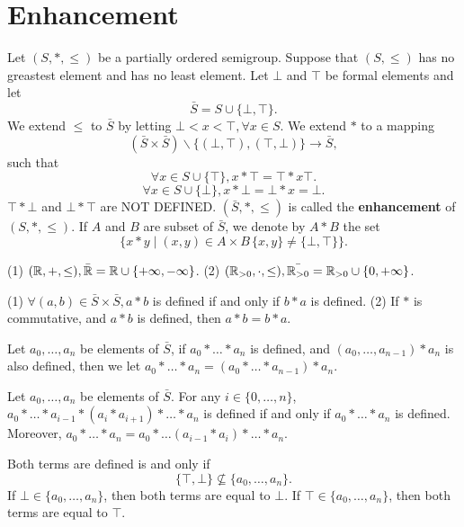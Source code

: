 \section{Enhancement}
\begin{definitionenv}
    Let $(S,*,\le)$ be a partially ordered semigroup. Suppose that $(S,\le )$ has no greastest element and has no least element. Let $\bot$ and $\top$ be formal elements and let 
    $$\bar{S}=S\cup\{\bot,\top\}.$$
    We extend $\le $ to $\bar{S}$ by letting $\bot<x<\top,\forall x\in S$. We extend $*$ to a mapping
    $$\left(\bar{S}\times\bar{S}\right)\backslash \{(\bot,\top),(\top,\bot)\}\longrightarrow \bar{S},$$
    such that 
    $$\forall x\in S\cup\{\top\},x*\top=\top*x\top.$$
    $$\forall x\in S\cup\{\bot\},x*\bot=\bot*x=\bot.$$
    $\top*\bot$ and $\bot*\top$ are NOT DEFINED. $(\bar{S},*,\le)$ is called the \textbf{enhancement} of $(S,*,\le)$. If $A$ and $B$ are subset of $\bar{S}$, we denote by $A*B$ the set 
    $$\{x*y\mid (x,y)\in A\times B\,\{x,y\}\not=\{\bot,\top\}\}.$$
\end{definitionenv}
\begin{exampleenv}
    \quad 
    \newline
    (1) $(\mathbb{R},+,\le ), \bar{\mathbb{R}}=\mathbb{R}\cup\{+\infty,-\infty\}$.
    \newline
    (2) $(\mathbb{R}_{>0},\cdot,\le),\bar{\mathbb{R}_{>0}}=\mathbb{R}_{>0}\cup\{0,+\infty\}$.
\end{exampleenv}
\begin{remark}
    \quad 
    \newline
    (1) $\forall (a,b)\in \bar{S}\times \bar{S}, a*b$ is defined if and only if $b*a$ is defined. 
    \newline
    (2) If $*$ is commutative, and $a*b$ is defined, then $a*b=b*a$.
\end{remark}
\begin{definitionenv}
    Let $a_0,\dots,a_n$ be elements of $\bar{S}$, if $a_0*\dots*a_n$ is defined, and $(a_0,\dots,a_{n-1})*a_n$ is also defined, then we let $a_0*\dots*a_n=\left(a_0*\dots*a_{n-1}\right)*a_n$.
\end{definitionenv}
\begin{propositionenv}
    Let $a_0,\dots,a_n$ be elements of $\bar{S}$. For any $i\in \{0,\dots,n\}$, $a_0*\dots*a_{i-1}*(a_i*a_{i+1})*\dots*a_n$ is defined if and only if $a_0*\dots*a_n$ is defined. Moreover, $a_0*\dots*a_n=a_0*\dots (a_{i-1}*a_i)*\dots*a_n $.
\end{propositionenv}
\begin{proofenv}
    Both terms are defined is and only if 
    $$\{\top,\bot\}\nsubseteq\{a_0,\dots,a_n\}.$$
    If $\bot\in\{a_0,\dots,a_n\}$, then both terms are equal to $\bot$. If $\top\in\{a_0,\dots,a_n\}$, then both terms are equal to $\top$. 
\end{proofenv}
